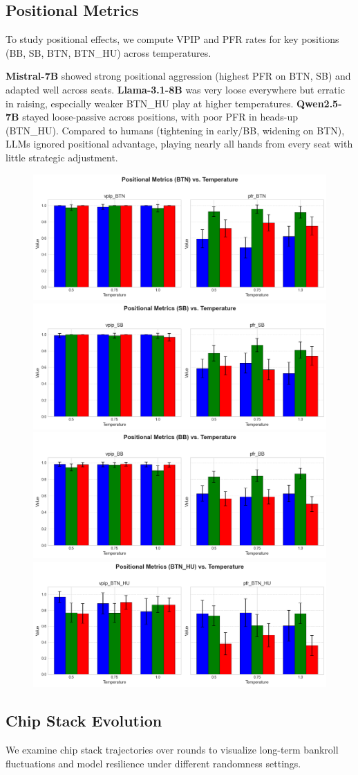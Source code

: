 \documentclass{article}
\begin{document}
\subsection{Positional Metrics}
To study positional effects, we compute VPIP and PFR rates for key positions (BB, SB, BTN, BTN\_HU) across temperatures.

\textbf{Mistral-7B} showed strong positional aggression (highest PFR on BTN, SB) and adapted well across seats. \textbf{Llama-3.1-8B} was very loose everywhere but erratic in raising, especially weaker BTN\_HU play at higher temperatures. \textbf{Qwen2.5-7B} stayed loose-passive across positions, with poor PFR in heads-up (BTN\_HU). Compared to humans (tightening in early/BB, widening on BTN), LLMs ignored positional advantage, playing nearly all hands from every seat with little strategic adjustment.
\begin{figure}[!htb]
\centering
\includegraphics[width=0.48\linewidth]{plots/positional_BTN_trends.png}\hfill
\includegraphics[width=0.48\linewidth]{plots/positional_SB_trends.png}
\includegraphics[width=0.48\linewidth]{plots/positional_BB_trends.png}\hfill
\includegraphics[width=0.48\linewidth]{plots/positional_BTN_HU_trends.png}
\end{figure}

\subsection{Chip Stack Evolution}
We examine chip stack trajectories over rounds to visualize long-term bankroll fluctuations and model resilience under different randomness settings.
\end{document}
